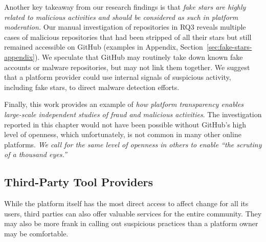 Another key takeaway from our research findings is that \emph{fake stars are highly related to malicious activities and should be considered as such in platform moderation.}
Our manual investigation of repositories in RQ3 reveals multiple cases of malicious repositories that had been stripped of all their stars but still remained accessible on GitHub (examples in Appendix, Section~\ref{sec:fake-stars-appendix}).
We speculate that GitHub may %
routinely take down known fake accounts or malware repositories, %
but may not link them together.
We suggest that a platform provider could use internal signals of suspicious activity, including fake stars, to direct malware detection efforts.

Finally, this work provides an example of \emph{how platform transparency enables large-scale independent studies of fraud and malicious activities}.
The investigation reported in this chapter would not have been possible without GitHub's high level of openness, which unfortunately, is not common in many other online platforms.
\emph{We call for the same level of openness in others to enable ``the scrutiny of a thousand eyes.''}

\subsection{Third-Party Tool Providers}
\label{sec:implications-sca}

While the platform itself has the most direct access to affect change for all its users, third parties can also offer valuable services for the entire community. 
They may also be more frank in calling out suspicious practices than a platform owner may be comfortable.


